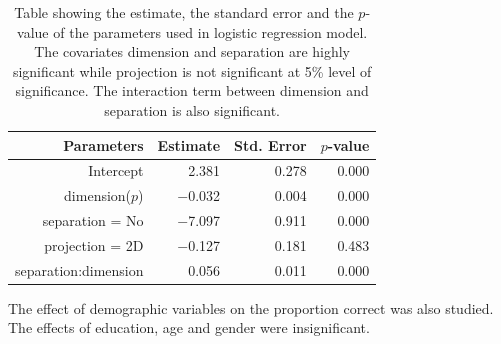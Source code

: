 \begin{table}[ht]
\begin{center}
\caption{Table showing the estimate, the standard error and the $p$-value of the parameters used in logistic regression model. The covariates dimension and separation are highly significant while projection is not significant at 5\% level of significance. The interaction term between dimension and separation is also significant.}
\vspace{0.15cm}
\begin{tabular}{r|rrr}
\hline
  \hline
 Parameters & Estimate & Std. Error  & $p$-value \\ 
  \hline
Intercept  & 2.381 & 0.278  & 0.000 \\ 
  dimension($p$) & $-$0.032 & 0.004  & 0.000 \\ 
  separation = No & $-$7.097 & 0.911  & 0.000 \\ 
  projection = 2D & $-$0.127 & 0.181  & 0.483 \\ 
  separation:dimension & 0.056 & 0.011 & 0.000\\
   \hline
\end{tabular}
\label{params}
\end{center}
\end{table}

The effect of demographic variables on the proportion correct was also studied. The effects of education, age and gender were insignificant. 



